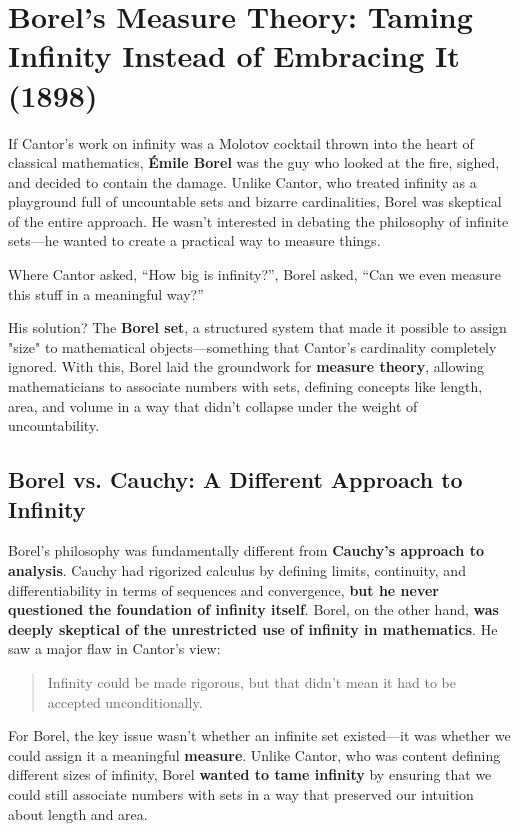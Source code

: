 \section{Borel’s Measure Theory: Taming Infinity Instead of Embracing It (1898)}

If Cantor’s work on infinity was a Molotov cocktail thrown into the heart of classical mathematics, \textbf{Émile Borel} was the guy who looked at the fire, sighed, and decided to contain the damage. Unlike Cantor, who treated infinity as a playground full of uncountable sets and bizarre cardinalities, Borel was skeptical of the entire approach. He wasn’t interested in debating the philosophy of infinite sets—he wanted to create a practical way to measure things.

Where Cantor asked, “How big is infinity?”, Borel asked, “Can we even measure this stuff in a meaningful way?” 

His solution? The \textbf{Borel set}, a structured system that made it possible to assign "size" to mathematical objects—something that Cantor’s cardinality completely ignored. With this, Borel laid the groundwork for \textbf{measure theory}, allowing mathematicians to associate numbers with sets, defining concepts like length, area, and volume in a way that didn’t collapse under the weight of uncountability.

\subsection{Borel vs. Cauchy: A Different Approach to Infinity}

Borel’s philosophy was fundamentally different from \textbf{Cauchy’s approach to analysis}. Cauchy had rigorized calculus by defining limits, continuity, and differentiability in terms of sequences and convergence, \textbf{but he never questioned the foundation of infinity itself}. Borel, on the other hand, \textbf{was deeply skeptical of the unrestricted use of infinity in mathematics}. He saw a major flaw in Cantor’s view:

\begin{quote}
Infinity could be made rigorous, but that didn’t mean it had to be accepted unconditionally.
\end{quote}

For Borel, the key issue wasn’t whether an infinite set existed—it was whether we could assign it a meaningful \textbf{measure}. Unlike Cantor, who was content defining different sizes of infinity, Borel \textbf{wanted to tame infinity} by ensuring that we could still associate numbers with sets in a way that preserved our intuition about length and area.

